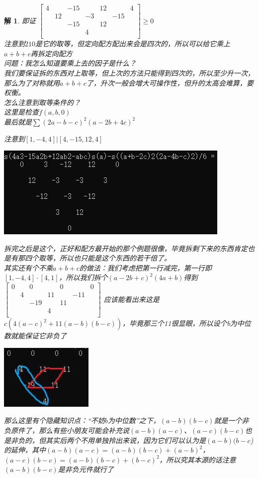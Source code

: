 \documentclass[UTF8]{ctexart}
\newtheorem{2}{解}
\begin{document}
\begin{2}
	即证
	$ \left[\begin{matrix}
		4& &-15& &12& &4\\
		&12& &-3& &-15&\\
		& &-15& &12& & \\
		& & &4& & &\\
	\end{matrix}\right] \ge 0$\\
	注意到$ 210 $是它的取等，但定向配方配出来会是四次的，所以可以给它乘上$ a+b+c $再拆定向配方\\
	问题：我怎么知道要乘上去的因子是什么？\\
	我们要保证拆的东西对上取等，但上次的方法只能得到四次的，所以至少升一次，那么为了对称就用$ a+b+c $了，升次一般会增大可操作性，但升的太高会难算，要权衡。\\
	怎么注意到取等条件的？\\
	这里是检查$ f(a,b,0) $\\
	最后就是$ \displaystyle \sum (2a-b-c)^{2}(a-2b+4c)^{2}$
	
	注意到$ [1,-4,4]|[4,-15,12,4] $
	\begin{center}
		\includegraphics[width=0.5\linewidth]{32}
	\end{center}
	拆完之后是这个，正好和配方最开始的那个例题很像，毕竟拆剩下来的东西肯定也是有那四个取等，所以也只能是这个东西的若干倍了。\\
	其实还有个不乘$ a+b+c $的做法：我们考虑把第一行减完，第一行即$ [1,-4,4]·[4,1] $，所以我们拆个$ (a-2b+c)^{2}(4a+b) $得到$ \left[\begin{matrix}
		0& &0& &0& &0\\
		&4& &11& &-11&\\
		& &-19& &11& & \\
		& & &4& & &\\
	\end{matrix}\right] $
    应该能看出来这是$ c(4(a-c)^{2}+11(a-b)(b-c)) $，毕竟那三个11很显眼，所以设个b为中位数就能保证它非负了
    \begin{center}
    	\includegraphics[width=0.3\linewidth]{33}
    \end{center}
    那么这里有个隐藏知识点：“不妨$ b $为中位数”之下，$ (a-b)(b-c) $就是一个非负原件了，那么有些小朋友可能会补充说$ (a-b)(a-c) $、$ (a-c)(b-c) $也是非负的，但其实后两个不用单独拎出来说，因为它们可以认为是$ (a-b)(b-c $)的延伸，其中$ (a-b)(a-c)=(a-b)(b-c)+(a-b)^{2} $，$ (a-c)(b-c)=(a-b)(b-c)+(b-c)^{2} $，所以究其本源的话注意$ (a-b)(b-c) $是非负元件就行了
\end{2}
\end{document}
